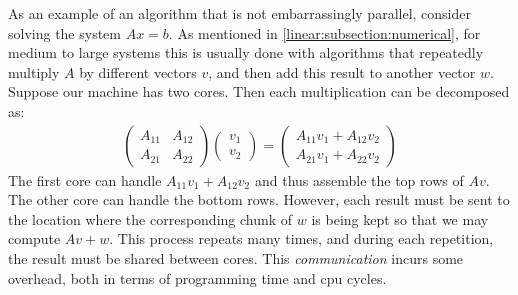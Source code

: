 As an example of an algorithm that is not embarrassingly parallel, consider solving the system $Ax = b$.  As mentioned in \ref{linear:subsection:numerical}, for medium to large systems this is usually done with algorithms that repeatedly multiply $A$ by different vectors $v$, and then add this result to another vector $w$.  Suppose our machine has two cores.  Then each multiplication can be decomposed as:
\begin{align}
  \label{performance:align:matvec}
  \left( 
  \begin{matrix}
    A_{11} & A_{12}\\
    A_{21} & A_{22}
  \end{matrix}
  \right)
  \left( 
  \begin{matrix}
    v_1\\
    v_2
  \end{matrix}
  \right)
  =
  \left( 
  \begin{matrix}
    A_{11}v_1 + A_{12}v_2 \\
    A_{21}v_1 + A_{22}v_2
  \end{matrix}
  \right)
\end{align}
The first core can handle $A_{11}v_1 + A_{12}v_2$ and thus assemble the top rows of $Av$.  The other core can handle the bottom rows.  However, each result must be sent to the location where the corresponding chunk of $w$ is being kept so that we may compute $Av + w$.  This process repeats many times, and during each repetition, the result must be shared between cores.  This \emph{communication} incurs some overhead, both in terms of programming time and cpu cycles.

